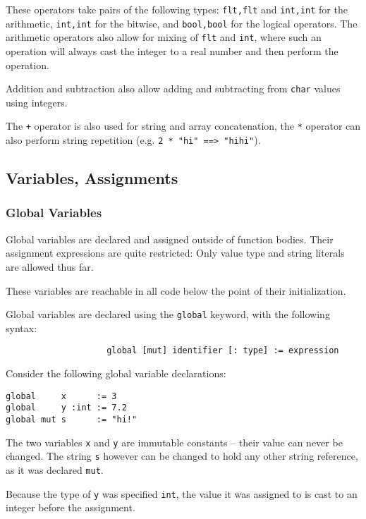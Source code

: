 \documentclass{article}
\newcommand{\code}[1]{\lstinline[columns=fixed]{#1}}
\begin{document}
			These operators take pairs of the following types: \code{flt,flt} and \code{int,int} for the arithmetic, \code{int,int} for the bitwise, and \code{bool,bool} for the logical operators. The arithmetic operators also allow for mixing of \code{flt} and \code{int}, where such an operation will always cast the integer to a real number and then perform the operation.
			
			Addition and subtraction also allow adding and subtracting from \code{char} values using integers.
			
			The \code{+} operator is also used for string and array concatenation, the \code{*} operator can also perform string repetition (e.g. \code{2 * "hi" ==> "hihi"}).
	
		\subsection{Variables, Assignments}
		
			\subsubsection{Global Variables}
			
				Global variables are declared and assigned outside of function bodies. Their assignment expressions are quite restricted: Only value type and string literals are allowed thus far.
				
				These variables are reachable in all code below the point of their initialization.
				
				Global variables are declared using the \code{global} keyword, with the following syntax:
				
				\begin{verbatim}
					global [mut] identifier [: type] := expression
				\end{verbatim}
				
				Consider the following global variable declarations:
				
				\begin{lstlisting}
global     x      := 3
global     y :int := 7.2
global mut s      := "hi!"
				\end{lstlisting}
				
				The two variables \code{x} and \code{y} are immutable constants -- their value can never be changed. The string \code{s} however can be changed to hold any other string reference, as it was declared \code{mut}.
				
				Because the type of \code{y} was specified \code{int}, the value it was assigned to is cast to an integer before the assignment.
				
\end{document}

